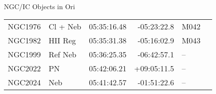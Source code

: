 \begin{block}{NGC/IC Objects in Ori}
  \centering
  \begin{tabularx}{\textwidth}{llrrll} \toprule 
    NGC1976 & Cl + Neb & 05:35:16.48 & -05:23:22.8  & M042 \\ 
    NGC1982 & HII Reg & 05:35:31.38 & -05:16:02.9  & M043 \\ 
    NGC1999 & Ref Neb & 05:36:25.35 & -06:42:57.1  & -- \\ 
    NGC2022 & PN & 05:42:06.21 & +09:05:11.5  & -- \\ 
    NGC2024 & Neb & 05:41:42.57 & -01:51:22.6  & -- \\ 
  \end{tabularx}
\end{block}